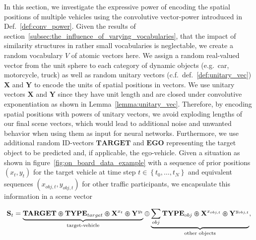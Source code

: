 In this section, we investigate the expressive power of encoding the spatial positions of multiple vehicles using the convolutive vector-power introduced in Def.~\ref{def:conv_power}.
Given the results of section~\ref{subsec:the_influence_of_varying_vocabularies}, that the impact of similarity structures in rather small vocabularies is neglectable, we create a random vocabulary $V$ of atomic vectors here.
We assign a random real-valued vector from the unit sphere to each category of dynamic objects (e.g.\ car, motorcycle, truck) as well as random unitary vectors (c.f.\ def.~\ref{def:unitary_vec}) $\mathbf{X}$ and $\mathbf{Y}$ to encode the units of spatial positions in vectors.
We use unitary vectors $\mathbf{X}$ and $\mathbf{Y}$ since they have unit length and are closed under convolutive exponentiation as shown in Lemma~\ref{lemma:unitary_vec}.
Therefore, by encoding spatial positions with powers of unitary vectors, we avoid exploding lengths of our final scene vectors, which would lead to additional noise and unwanted behavior when using them as input for neural networks.
Furthermore, we use additional random ID-vectors $\mathbf{TARGET}$ and $\mathbf{EGO}$ representing the target object to be predicted and, if applicable, the ego-vehicle.
Given a situation as shown in figure~\ref{fig:on_board_data_example} with a sequence of prior positions $(x_{t}, y_{t})$ for the target vehicle at time step $t \in \left\{t_{0}, \ldots, t_{N} \right\}$ and equivalent sequences $(x_{obj,t}, y_{obj,t})$ for other traffic participants, we encapsulate this information in a scene vector

\begin{equation}
	\label{eq:conv_power_enc}
  \mathbf{S}_{t} = \underbrace{\mathbf{TARGET}\varoast \mathbf{TYPE}_{target} \varoast \mathbf{X}^{x_{t}} \varoast \mathbf{Y}^{y_{t}}}_{\textrm{target-vehicle}} \oplus \underbrace{\sum_{obj} \mathbf{TYPE}_{obj} \varoast \mathbf{X}^{x_{obj,t}} \varoast \mathbf{Y}^{y_{obj,t}}}_{\textrm{other objects}},
\end{equation}

